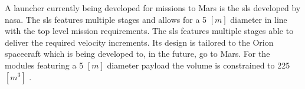 A launcher currently being developed for missions to Mars is the \acrfull{sls} developed by \gls{nasa}. The \gls{sls} features multiple stages and allows for a 5 $[m]$ diameter in line with the top level mission requirements. The \gls{sls} features multiple stages able to deliver the required velocity increments. Its design is tailored to the Orion spacecraft which is being developed to, in the future, go to Mars. For the modules featuring a 5 $[m]$ diameter payload the volume is constrained to 225 $[m^3]$ \cite{NASA2014}.


